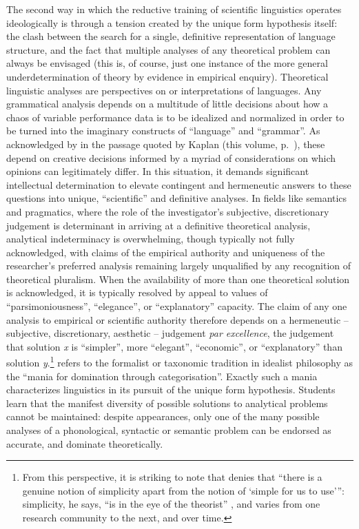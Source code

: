 \documentclass[output=paper]{langscibook}
\begin{document}
The second way in which the reductive training of scientific linguistics operates ideologically is through a tension created by the unique form hypothesis itself: the clash between the search for a single, definitive representation of language structure, and the fact that multiple analyses of any theoretical problem can always be envisaged (this is, of course, just one instance of the more general underdetermination of theory by evidence in empirical enquiry). Theoretical linguistic analyses are perspectives on or interpretations of languages. Any grammatical analysis depends on a multitude of little decisions about how a chaos of variable performance data is to be idealized and normalized in order to be turned into the imaginary constructs of ``language'' and ``grammar''. As acknowledged by \citet[147]{Hockett1958} in the passage quoted by Kaplan (this volume, p.~\pageref{kaplan:hockettquote}), these depend on creative decisions informed by a myriad of considerations on which opinions can legitimately differ. In this situation, it demands significant intellectual determination to elevate contingent and hermeneutic answers to these questions into unique, ``scientific'' and definitive analyses. In fields like semantics and pragmatics, where the role of the investigator's subjective, discretionary judgement is determinant in arriving at a definitive theoretical analysis, analytical indeterminacy is overwhelming, though typically not fully acknowledged, with claims of the empirical authority and uniqueness of the researcher's preferred analysis remaining largely unqualified by any recognition of theoretical pluralism. When the availability of more than one theoretical solution is acknowledged, it is typically resolved by appeal to values of ``parsimoniousness'', ``elegance'', or ``explanatory'' capacity. The claim of any one analysis to empirical or scientific authority therefore depends on a hermeneutic -- subjective, discretionary, aesthetic -- judgement \emph{par excellence}, the judgement that solution \emph{x} is ``simpler'', more ``elegant'', ``economic'', or ``explanatory'' than solution \emph{y}.\footnote{From this perspective, it is striking to note that \citet[159]{Ludlow2011} denies that ``there is a genuine notion of simplicity apart from the notion of `simple for us to use'\thinspace'': simplicity, he says, ``is in the eye of the theorist'' \citep[161]{Ludlow2011}, and varies from one research community to the next, and over time.} \citet[105]{Althusser2015} refers to the formalist or taxonomic tradition in idealist philosophy as the ``mania for domination through categorisation''. Exactly such a mania characterizes linguistics in its pursuit of the unique form hypothesis. Students learn that the manifest diversity of possible solutions to analytical problems cannot be maintained: despite appearances, only one of the many possible analyses of a phonological, syntactic or semantic problem can be endorsed as accurate, and dominate theoretically.
\end{document}
